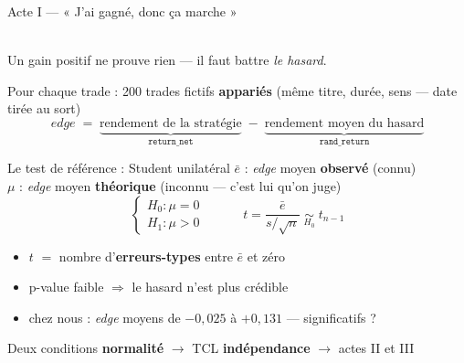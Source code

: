 \documentclass[10pt]{beamer}
\newcommand{\edge}{\textit{edge}}
\begin{document}
\begin{frame}{Acte I --- « J'ai gagné, donc ça marche »}
  \begin{center}
    \\
    Un gain positif ne prouve rien --- il faut battre \emph{le hasard}.
  \end{center}
  \vspace{4mm}
  Pour chaque trade : 200 trades fictifs \textbf{appariés}
  (même titre, durée, sens --- date tirée au sort)
  \[
    \edge \;=\; \underbrace{\text{rendement de la stratégie}}_{\texttt{return\_net}}
      \;-\; \underbrace{\text{rendement moyen du hasard}}_{\texttt{rand\_return}}
  \]
\end{frame}

\begin{frame}{Le test de référence : Student unilatéral}
  $\bar e$ : \edge{} moyen \textbf{observé} (connu)\\[1mm]
  $\mu$ : \edge{} moyen \textbf{théorique} (inconnu --- c'est lui qu'on juge)
  \vspace{3mm}
  \[
    \begin{cases}
      H_0 : \mu = 0\\
      H_1 : \mu > 0
    \end{cases}
    \qquad\quad
    t = \frac{\bar e}{s/\sqrt{n}} \;\underset{H_0}{\sim}\; t_{n-1}
  \]
  \vspace{2mm}
  \begin{itemize}\setlength{\itemsep}{3mm}
    \item $t$ $=$ nombre d'\textbf{erreurs-types} entre $\bar e$ et zéro
    \item p-value faible $\Rightarrow$ le hasard n'est plus crédible
    \item chez nous : \edge{} moyens de $-0{,}025$ à $+0{,}131$ ---
      significatifs ?
  \end{itemize}
  \vspace{4mm}
  \begin{block}{Deux conditions}
    \textbf{normalité} $\to$ TCL \qquad\qquad
    \textbf{indépendance} $\to$ actes II et III
  \end{block}
\end{frame}
\end{document}
